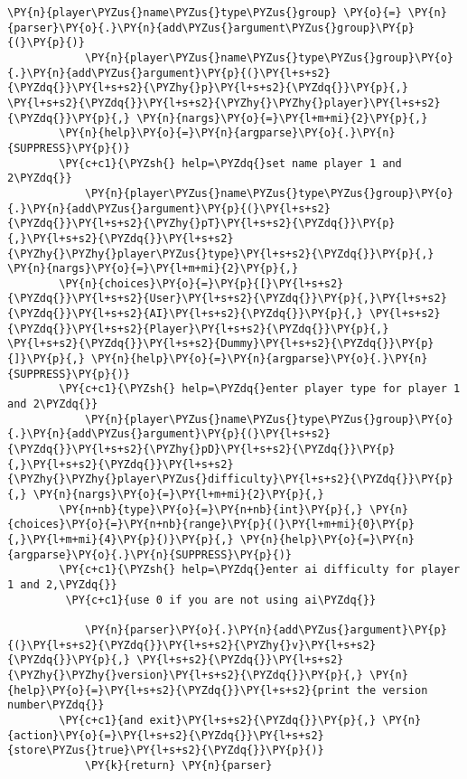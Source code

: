\begin{Verbatim}[commandchars=\\\{\}]
            \PY{n}{player\PYZus{}name\PYZus{}type\PYZus{}group} \PY{o}{=} \PY{n}{parser}\PY{o}{.}\PY{n}{add\PYZus{}argument\PYZus{}group}\PY{p}{(}\PY{p}{)}
            \PY{n}{player\PYZus{}name\PYZus{}type\PYZus{}group}\PY{o}{.}\PY{n}{add\PYZus{}argument}\PY{p}{(}\PY{l+s+s2}{\PYZdq{}}\PY{l+s+s2}{\PYZhy{}p}\PY{l+s+s2}{\PYZdq{}}\PY{p}{,} \PY{l+s+s2}{\PYZdq{}}\PY{l+s+s2}{\PYZhy{}\PYZhy{}player}\PY{l+s+s2}{\PYZdq{}}\PY{p}{,} \PY{n}{nargs}\PY{o}{=}\PY{l+m+mi}{2}\PY{p}{,} 
		\PY{n}{help}\PY{o}{=}\PY{n}{argparse}\PY{o}{.}\PY{n}{SUPPRESS}\PY{p}{)} 
		\PY{c+c1}{\PYZsh{} help=\PYZdq{}set name player 1 and 2\PYZdq{}}
            \PY{n}{player\PYZus{}name\PYZus{}type\PYZus{}group}\PY{o}{.}\PY{n}{add\PYZus{}argument}\PY{p}{(}\PY{l+s+s2}{\PYZdq{}}\PY{l+s+s2}{\PYZhy{}pT}\PY{l+s+s2}{\PYZdq{}}\PY{p}{,}\PY{l+s+s2}{\PYZdq{}}\PY{l+s+s2}{\PYZhy{}\PYZhy{}player\PYZus{}type}\PY{l+s+s2}{\PYZdq{}}\PY{p}{,} \PY{n}{nargs}\PY{o}{=}\PY{l+m+mi}{2}\PY{p}{,} 
		\PY{n}{choices}\PY{o}{=}\PY{p}{[}\PY{l+s+s2}{\PYZdq{}}\PY{l+s+s2}{User}\PY{l+s+s2}{\PYZdq{}}\PY{p}{,}\PY{l+s+s2}{\PYZdq{}}\PY{l+s+s2}{AI}\PY{l+s+s2}{\PYZdq{}}\PY{p}{,} \PY{l+s+s2}{\PYZdq{}}\PY{l+s+s2}{Player}\PY{l+s+s2}{\PYZdq{}}\PY{p}{,} \PY{l+s+s2}{\PYZdq{}}\PY{l+s+s2}{Dummy}\PY{l+s+s2}{\PYZdq{}}\PY{p}{]}\PY{p}{,} \PY{n}{help}\PY{o}{=}\PY{n}{argparse}\PY{o}{.}\PY{n}{SUPPRESS}\PY{p}{)} 
		\PY{c+c1}{\PYZsh{} help=\PYZdq{}enter player type for player 1 and 2\PYZdq{}}
            \PY{n}{player\PYZus{}name\PYZus{}type\PYZus{}group}\PY{o}{.}\PY{n}{add\PYZus{}argument}\PY{p}{(}\PY{l+s+s2}{\PYZdq{}}\PY{l+s+s2}{\PYZhy{}pD}\PY{l+s+s2}{\PYZdq{}}\PY{p}{,}\PY{l+s+s2}{\PYZdq{}}\PY{l+s+s2}{\PYZhy{}\PYZhy{}player\PYZus{}difficulty}\PY{l+s+s2}{\PYZdq{}}\PY{p}{,} \PY{n}{nargs}\PY{o}{=}\PY{l+m+mi}{2}\PY{p}{,} 
		\PY{n+nb}{type}\PY{o}{=}\PY{n+nb}{int}\PY{p}{,} \PY{n}{choices}\PY{o}{=}\PY{n+nb}{range}\PY{p}{(}\PY{l+m+mi}{0}\PY{p}{,}\PY{l+m+mi}{4}\PY{p}{)}\PY{p}{,} \PY{n}{help}\PY{o}{=}\PY{n}{argparse}\PY{o}{.}\PY{n}{SUPPRESS}\PY{p}{)} 
		\PY{c+c1}{\PYZsh{} help=\PYZdq{}enter ai difficulty for player 1 and 2,\PYZdq{}}
 		 \PY{c+c1}{use 0 if you are not using ai\PYZdq{}}
        
            \PY{n}{parser}\PY{o}{.}\PY{n}{add\PYZus{}argument}\PY{p}{(}\PY{l+s+s2}{\PYZdq{}}\PY{l+s+s2}{\PYZhy{}v}\PY{l+s+s2}{\PYZdq{}}\PY{p}{,} \PY{l+s+s2}{\PYZdq{}}\PY{l+s+s2}{\PYZhy{}\PYZhy{}version}\PY{l+s+s2}{\PYZdq{}}\PY{p}{,} \PY{n}{help}\PY{o}{=}\PY{l+s+s2}{\PYZdq{}}\PY{l+s+s2}{print the version number\PYZdq{}}
		\PY{c+c1}{and exit}\PY{l+s+s2}{\PYZdq{}}\PY{p}{,} \PY{n}{action}\PY{o}{=}\PY{l+s+s2}{\PYZdq{}}\PY{l+s+s2}{store\PYZus{}true}\PY{l+s+s2}{\PYZdq{}}\PY{p}{)}
            \PY{k}{return} \PY{n}{parser}
\end{Verbatim}

